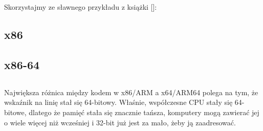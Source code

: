 \section{\HelloWorldSectionName}
\label{sec:helloworld}

Skorzystajmy ze sławnego przykładu z książki [\KRBook]:



\subsection{x86}





\subsection{x86-64}








\subsection{\Conclusion{}}

Największa różnica między kodem w x86/ARM a x64/ARM64 polega na tym, że wskaźnik na linię stał się 64-bitowy.
Właśnie, współczesne \ac{CPU} stały się 64-bitowe, dlatego że pamięć stała się znacznie tańsza,
komputery mogą zawierać jej o wiele więcej niż wcześniej i 32-bit już jest za mało, żeby ją zaadresować.





